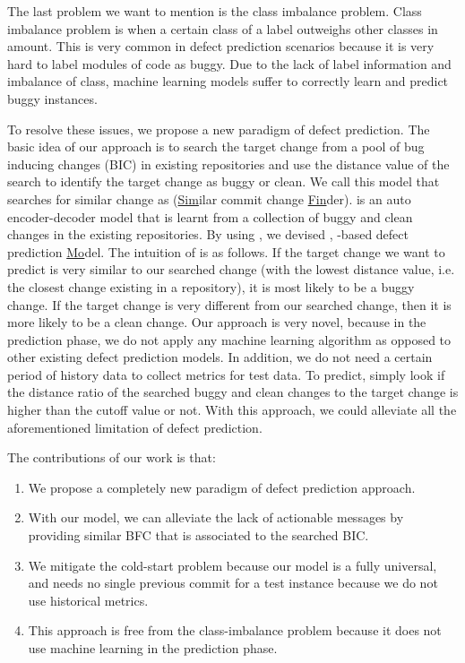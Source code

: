 The last problem we want to mention is the class imbalance problem.
Class imbalance problem is when a certain class of a label outweighs other classes in amount.
This is very common in defect prediction scenarios because it is very hard to label modules of code as buggy.
Due to the lack of label information and imbalance of class, machine learning models suffer to correctly learn and predict buggy instances.

To resolve these issues, we propose a new paradigm of defect prediction.
The basic idea of our approach is to search the target change from a pool of bug inducing changes (BIC) in existing repositories and use the distance value of the search to identify the target change as buggy or clean.
We call this model that searches for similar change as {\simfin} (\underline{Sim}ilar commit change \underline{Fin}der).
{\simfin} is an auto encoder-decoder model that is learnt from a collection of buggy and clean changes in the existing repositories. By using {\simfin}, we devised {\simfinmo}, \underline{\simfin}-based defect prediction \underline{Mo}del. The intuition of {\simfin} is as follows.
If the target change we want to predict is very similar to our searched change (with the lowest distance value, i.e. the closest change existing in a repository), it is most likely to be a buggy change.
If the target change is very different from our searched change, then it is more likely to be a clean change. 
Our approach is very novel, because in the prediction phase, we do not apply any machine learning algorithm as opposed to other existing defect prediction models. In addition, we do not need a certain period of history data to collect metrics for test data.
To predict, {\simfinmo} simply look if the distance ratio of the searched buggy and clean changes to the target change is higher than the cutoff value or not.
With this approach, we could alleviate all the aforementioned limitation of defect prediction.

\vspace{3mm}
The contributions of our work is that:
\begin{enumerate}
    \item We propose a completely new paradigm of defect prediction approach.
    \item With our model, we can alleviate the lack of actionable messages by providing similar BFC that is associated to the searched BIC.
    \item We mitigate the cold-start problem because our model is a fully universal, and needs no single previous commit for a test instance because we do not use historical metrics.
    \item This approach is free from the class-imbalance problem because it does not use machine learning in the prediction phase.
\end{enumerate}


